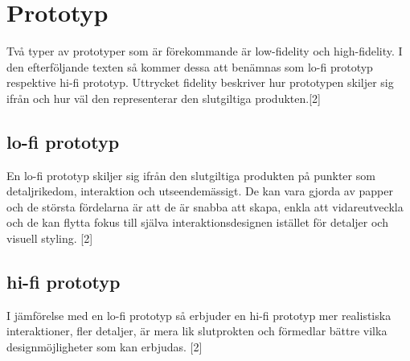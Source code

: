 \section{Prototyp} 
Två typer av prototyper som är förekommande är low-fidelity och high-fidelity. I den efterföljande texten så  kommer dessa att benämnas som lo-fi prototyp respektive hi-fi prototyp. Uttrycket fidelity beskriver hur prototypen skiljer sig ifrån och hur väl den representerar den slutgiltiga produkten.[2]  

\subsection{lo-fi prototyp} 
En lo-fi prototyp skiljer sig ifrån den slutgiltiga produkten på punkter som detaljrikedom, interaktion och utseendemässigt. De kan vara gjorda av papper och de största fördelarna är att de är snabba att skapa, enkla att vidareutveckla  och de kan flytta fokus till själva interaktionsdesignen istället för detaljer och visuell styling. [2]

\subsection{hi-fi prototyp}
I jämförelse med en lo-fi prototyp så erbjuder en hi-fi prototyp mer realistiska interaktioner, fler detaljer, är mera lik slutprokten och förmedlar bättre vilka designmöjligheter som kan erbjudas. [2] 

